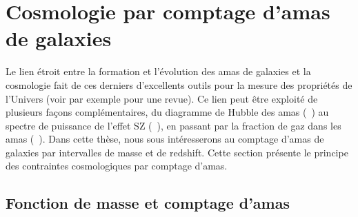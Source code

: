 \section{Cosmologie par comptage d'amas de galaxies} \label{sec:cluster_nbcount}

Le lien étroit entre la formation et l'évolution des amas de galaxies et la cosmologie fait de ces derniers d'excellents outils pour la mesure des propriétés de l'Univers (voir par exemple \cite{allen_cosmological_2011} pour une revue).
Ce lien peut être exploité de plusieurs façons complémentaires, du diagramme de Hubble des amas (\eg\ \cite{kozmanyan_deriving_2019}) au spectre de puissance de l'effet SZ (\eg\ \cite{ruppin_impact_2019}), en passant par la fraction de gaz dans les amas (\eg\ \cite{mantz_cosmology_2014}).
Dans cette thèse, nous sous intéresserons au comptage d'amas de galaxies par intervalles de masse et de redshift.
Cette section présente le principe des contraintes cosmologiques par comptage d'amas.

\subsection{Fonction de masse et comptage d'amas}

